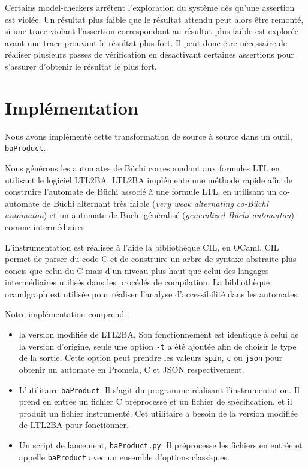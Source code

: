 Certains model-checkers arrêtent l'exploration du système dès qu'une assertion
est violée. Un résultat plus faible que le résultat attendu peut alors
être remonté, si une trace violant l'assertion correspondant au résultat plus
faible est explorée avant une trace prouvant le résultat plus fort. Il peut donc
être nécessaire de réaliser plusieurs passes de vérification en désactivant
certaines assertions pour s'assurer d'obtenir le résultat le plus fort.

\section{Implémentation}

Nous avons implémenté cette transformation de source à source dans un outil,
\texttt{baProduct}.

Nous générons les automates de Büchi correspondant aux formules LTL en
utilisant le logiciel LTL2BA\cite{ltl2ba}. LTL2BA implémente
une méthode rapide afin de construire l'automate de Büchi associé à une
formule LTL, en utilisant un co-automate de Büchi alternant très faible
(\emph{very weak alternating co-Büchi automaton}) et un automate de
Büchi généralisé (\emph{generalized Büchi automaton}) comme intermédiaires.

L'instrumentation est réalisée à l'aide la bibliothèque
CIL\cite{cil}, en OCaml\cite{ocamlrefman}. CIL permet de parser
du code C et de construire un arbre de syntaxe abstraite plus concis que
celui du C mais d'un niveau plus haut que celui des langages
intermédiaires utilisés dans les procédés de compilation. La
bibliothèque ocamlgraph\cite{ocamlgraph} est utilisée pour réaliser
l'analyse d'accessibilité dans les automates.

Notre implémentation comprend :

\begin{itemize}
\item
  la version modifiée de LTL2BA. Son fonctionnement est identique à
  celui de la version d'origine, seule une option \texttt{-t} a été
  ajoutée afin de choisir le type de la sortie. Cette option peut
  prendre les valeurs \texttt{spin}, \texttt{c} ou
  \texttt{json} pour obtenir un automate en Promela, C et JSON
  respectivement.
\item
  L'utilitaire \texttt{baProduct}. Il s'agit du programme réalisant
  l'instrumentation. Il prend en entrée un fichier C préprocessé et un
  fichier de spécification, et il produit un fichier instrumenté. Cet
  utilitaire a besoin de la version modifiée de LTL2BA pour fonctionner.
\item
  Un script de lancement, \texttt{baProduct.py}. Il préprocesse les
  fichiers en entrée et appelle \texttt{baProduct} avec un ensemble
  d'options classiques.
\end{itemize}

